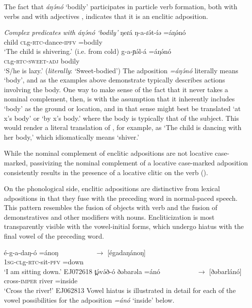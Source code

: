 The fact that \textit{áŋə́nó} `bodily' participates in particle verb formation, both with verbs  and with adjectives , indicates that it is an enclitic adposition.

\ea \textit{Complex predicates with  \textit{áŋə́nó} `bodily'} 
\ea \gll ŋeɾá ŋ-a-ɾə́t-íə =áŋə́nó\\
			child \textsc{cl}g-\textsc{rtc-}dance-\textsc{ipfv} =bodily \\
\glt	`The child is shivering.' (i.e. from cold) \label{ex:ch13:bodyv}
\ex \gll g-a-ɲə́l-á =áŋə́nó\\ 
\textsc{cl}g-\textsc{rtc}-\textsc{sweet}-\textsc{adj} bodily\\
\glt `S/he is lazy.’ (\textit{literally}: `Sweet-bodied')\label{ex:ch13:bodya}
\z 
\z
The adposition \textit{=áŋə́nó} literally means `body', and as the examples above demonstrate typically describes actions involving the body. One way to make sense of the fact that it never takes a nominal complement, then, is with the assumption that it inherently includes `body' as the ground or location, and in that sense might best be translated `at x's body' or `by x's body.' where the body is typically that of the subject. This would render a literal translation of , for example, as `The child is dancing with her body,' which idiomatically means `shiver.'

While the nominal complement of enclitic adpositions are not locative case-marked, passivizing the nominal complement of a locative case-marked adposition consistently results in the presence of a locative clitic on the verb ().

On the phonological side, enclitic adpositions are distinctive from lexical adpositions in that they fuse with the preceding word in normal-paced speech. This pattern resembles the fusion of objects with verb and the fusion of demonstratives and other modifiers with nouns. Encliticization is most transparently visible with the vowel-initial forms, which undergo hiatus with the final vowel  of the preceding word.  %

\ea \gll é-g-a-daŋ-ó =ánoŋ {\ \ \ \ \ \ \ \ \ \ $\to$ [égadaŋánoŋ]}\\
\textsc{1sg-cl}g-\textsc{rtc}-sit-\textsc{pfv} =down {}\\
\glt `I am sitting down.' \hfill	EJ072618
\ex \gll t̪ə́və́ð-ó ðəbarəla =ánó {\ \ \ \ \ \ \ \ \ \ $\to$ [ðəbarlánó]}\\
cross-\textsc{imper} river =inside {} \\
\glt `Cross the river!'	 \hfill	EJ062813
\z
Vowel hiatus is illustrated in detail for each of the vowel possibilities for the adposition \textit{=ánó} `inside' below.

